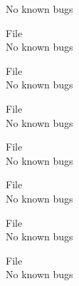 \begin{DoxyRefList}
\label{bug__bug000025}%
%
No known bugs  
\item[File \doxylink{SAT__Const_8h}{SAT\+\_\+\+Const.h} ]\hfill \\
\label{bug__bug000026}%
%
No known bugs  
\item[File \doxylink{sign___8cpp}{sign\+\_\+.cpp} ]\hfill \\
\label{bug__bug000055}%
%
No known bugs  
\item[File \doxylink{sign___8h}{sign\+\_\+.h} ]\hfill \\
\label{bug__bug000027}%
%
No known bugs  
\item[File \doxylink{timediff_8cpp}{timediff.cpp} ]\hfill \\
\label{bug__bug000056}%
%
No known bugs  
\item[File \doxylink{timediff_8h}{timediff.h} ]\hfill \\
\label{bug__bug000028}%
%
No known bugs  
\item[File \doxylink{TimeUpdate_8cpp}{Time\+Update.cpp} ]\hfill \\
\label{bug__bug000057}%
%
No known bugs  
\item[File \doxylink{TimeUpdate_8h}{Time\+Update.h} ]\hfill \\
\label{bug__bug000029}%
%
No known bugs 
\end{DoxyRefList}